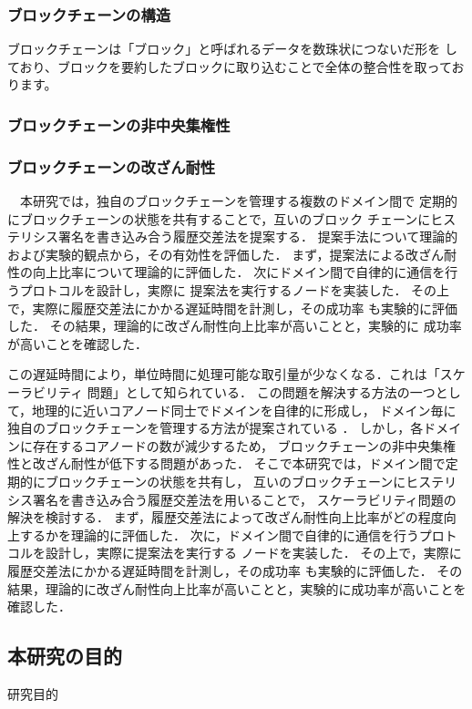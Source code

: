 \documentclass[a4paper,12pt]{jsarticle}
\begin{document}
\subsubsection{ブロックチェーンの構造}

ブロックチェーンは「ブロック」と呼ばれるデータを数珠状につないだ形を
しており、ブロックを要約したブロックに取り込むことで全体の整合性を取っております。

\subsubsection{ブロックチェーンの非中央集権性}

\subsubsection{ブロックチェーンの改ざん耐性}

　本研究では，独自のブロックチェーンを管理する複数のドメイン間で
定期的にブロックチェーンの状態を共有することで，互いのブロック
チェーンにヒステリシス署名を書き込み合う履歴交差法を提案する．
提案手法について理論的および実験的観点から，その有効性を評価した．
まず，提案法による改ざん耐性の向上比率について理論的に評価した．
次にドメイン間で自律的に通信を行うプロトコルを設計し，実際に
提案法を実行するノードを実装した．
その上で，実際に履歴交差法にかかる遅延時間を計測し，その成功率
も実験的に評価した．
その結果，理論的に改ざん耐性向上比率が高いことと，実験的に
成功率が高いことを確認した．

この遅延時間により，単位時間に処理可能な取引量が少なくなる．これは「スケーラビリティ
問題」として知られている． 
この問題を解決する方法の一つとして，地理的に近いコアノード同士でドメインを自律的に形成し，
ドメイン毎に独自のブロックチェーンを管理する方法が提案されている \cite{fujihara1}\cite{fujihara2}．
しかし，各ドメインに存在するコアノードの数が減少するため，
ブロックチェーンの非中央集権性と改ざん耐性が低下する問題があった．
そこで本研究では，ドメイン間で定期的にブロックチェーンの状態を共有し，
互いのブロックチェーンにヒステリシス署名\cite{suzaki}を書き込み合う履歴交差法を用いることで，
スケーラビリティ問題の解決を検討する．
まず，履歴交差法によって改ざん耐性向上比率がどの程度向上するかを理論的に評価した．
次に，ドメイン間で自律的に通信を行うプロトコルを設計し，実際に提案法を実行する
ノードを実装した．
その上で，実際に履歴交差法にかかる遅延時間を計測し，その成功率
も実験的に評価した．
その結果，理論的に改ざん耐性向上比率が高いことと，実験的に成功率が高いことを確認した．

\subsection{本研究の目的}
研究目的
\end{document}
